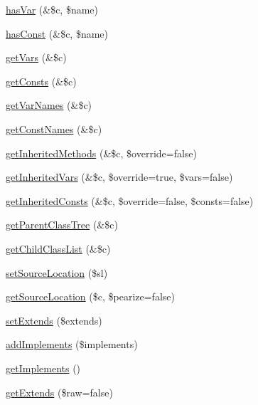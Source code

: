 \begin{DoxyCompactItemize}
\item 
\hyperlink{classparser_class_a9944b8c1f3b52b2e0185c86cade96b9c}{has\-Var} (\&\$c, \$name)
\item 
\hyperlink{classparser_class_a1d475fef72f6e6bb611f834d874c5169}{has\-Const} (\&\$c, \$name)
\item 
\hyperlink{classparser_class_a55bf37d3c3aab203f3a913818d764783}{get\-Vars} (\&\$c)
\item 
\hyperlink{classparser_class_a79af9f6b2d56c1a34ae87bb01e7bf865}{get\-Consts} (\&\$c)
\item 
\hyperlink{classparser_class_ab03786ca64a0f4d64d9cd9bcfd72bd78}{get\-Var\-Names} (\&\$c)
\item 
\hyperlink{classparser_class_a0bf32c1395f1c9e13a1a000e02b34bf1}{get\-Const\-Names} (\&\$c)
\item 
\hyperlink{classparser_class_a7587a2ec08debe8bc9c9a094824f0d32}{get\-Inherited\-Methods} (\&\$c, \$override=false)
\item 
\hyperlink{classparser_class_a96111cfab9865bc126b17b7dca1de6b0}{get\-Inherited\-Vars} (\&\$c, \$override=true, \$vars=false)
\item 
\hyperlink{classparser_class_ae63af5ca71734277b1c8e2805d6fdf29}{get\-Inherited\-Consts} (\&\$c, \$override=false, \$consts=false)
\item 
\hyperlink{classparser_class_a7d8f575bf5b5a0ba1d6fd2822b86103b}{get\-Parent\-Class\-Tree} (\&\$c)
\item 
\hyperlink{classparser_class_aebc8f7960079b472336487b411d94955}{get\-Child\-Class\-List} (\&\$c)
\item 
\hyperlink{classparser_class_a26b8e585007840b2d3e1a4b69557428a}{set\-Source\-Location} (\$sl)
\item 
\hyperlink{classparser_class_a263e11db9579a5665a2ec25fbc9b2c9c}{get\-Source\-Location} (\$c, \$pearize=false)
\item 
\hyperlink{classparser_class_a93251bf4bed03a236f9daafaabcdfb4c}{set\-Extends} (\$extends)
\item 
\hyperlink{classparser_class_aa5338e6ec889560d7ca240594b3af50b}{add\-Implements} (\$implements)
\item 
\hyperlink{classparser_class_a42e81b9ccdfda9bb706cfcb39aefa1e6}{get\-Implements} ()
\item 
\hyperlink{classparser_class_a8c3dfbba0499af61016d7ea9b5749ddd}{get\-Extends} (\$raw=false)
\end{DoxyCompactItemize}
